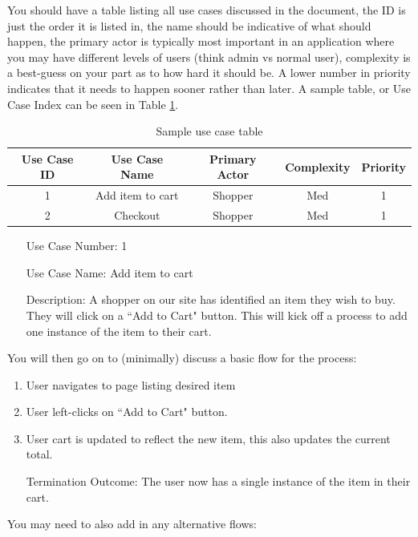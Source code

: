 \documentclass[10pt,conference,onecolumn,compsoc]{IEEEtran}
\begin{document}
You should have a table listing all use cases discussed in the document, the ID is just the order it is listed in, the name should be indicative of what should happen, the primary actor is typically most important in an application where you may have different levels of users (think admin vs normal user), complexity is a best-guess on your part as to how hard it should be.  A lower number in priority indicates that it needs to happen sooner rather than later.  A sample table, or Use Case Index can be seen in Table \ref{tab:useCaseIndex}.




\begin{table}
\centering
\begin{tabular}{|c|c|c|c|c|}
\hline
Use Case ID & Use Case Name & Primary Actor & Complexity & Priority \\
\hline \hline
1 & Add item to cart & Shopper & Med & 1\\
\hline
2 & Checkout & Shopper & Med & 1\\
\hline

\end{tabular}
\caption{Sample use case table}
\label{tab:useCaseIndex}
\end{table}


\begin{itemize}
\item[Use Case Number:] 1
\item[Use Case Name:] Add item to cart
\item[Description:] A shopper on our site has identified an item they wish to buy.  They will click on a ``Add to Cart" button.  This will kick off a process to add one instance of the item to their cart.
\end{itemize}

You will then go on to (minimally) discuss a basic flow for the process:

\begin{enumerate}
\item User navigates to page listing desired item
\item User left-clicks on ``Add to Cart" button.
\item User cart is updated to reflect the new item, this also updates the current total.
\item[Termination Outcome:] The user now has a single instance of the item in their cart.
\end{enumerate}

You may need to also add in any alternative flows:
\end{document}
